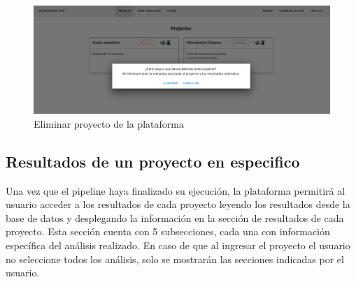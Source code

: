 \begin{figure}[H]
    \includegraphics[width=1\linewidth]{images/app/deleteProject.png}

    \caption{Eliminar proyecto de la plataforma}
    \label{fig:app-delete-project}
\end{figure}

\subsection{Resultados de un proyecto en especifico}
Una vez que el pipeline haya finalizado su ejecución, la plataforma permitirá al usuario acceder a los resultados de cada proyecto leyendo los resultados desde la base de datos y desplegando la información en la sección de resultados de cada proyecto.
Esta sección cuenta con 5 subsecciones, cada una con información específica del análisis realizado. 
En caso de que al ingresar el proyecto el usuario no seleccione todos los análisis, solo se mostrarán las secciones indicadas por el usuario.

